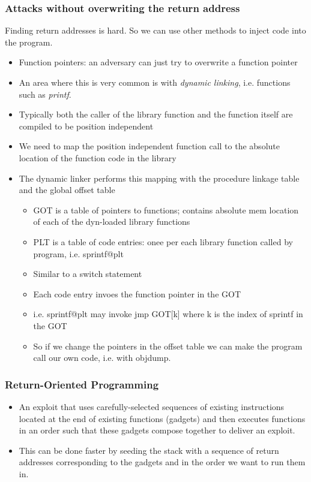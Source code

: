 \documentclass[../notes.tex]{subfiles}
\begin{document}
\subsubsection{Attacks without overwriting the return address}

Finding return addresses is hard. So we can use other methods to inject code into the program.

\begin{itemize}
    \item Function pointers: an adversary can just try to overwrite a function pointer
    \item An area where this is very common is with \textit{dynamic linking}, i.e. functions such as \textit{printf}. 
    \item Typically both the caller of the library function and the function itself are compiled to be position independent
    \item We need to map the position independent function call to the absolute location of the function code in the library
    \item The dynamic linker performs this mapping with the procedure linkage table and the global offset table
        \begin{itemize}
            \item GOT is a table of pointers to functions; contains absolute mem location of each of the dyn-loaded library functions
            \item PLT is a table of code entries: onee per each library function called by program, i.e. sprintf@plt
            \item Similar to a switch statement
            \item Each code entry invoes the function pointer in the GOT
            \item i.e. sprintf@plt may invoke jmp GOT[k] where k is the index of sprintf in the GOT
            \item So if we change the pointers in the offset table we can make the program call our own code, i.e. with objdump.

        \end{itemize}
\end{itemize}




\subsubsection{Return-Oriented Programming}
\begin{itemize}
    \item An exploit that uses carefully-selected sequences of existing instructions located at the end of existing functions (gadgets) and then executes functions in an order such that these gadgets compose together to deliver an exploit. 
    \item This can be done faster by seeding the stack with a sequence of return addresses corresponding to the gadgets and in the order we want to run them in.
\end{itemize}
\end{document}
